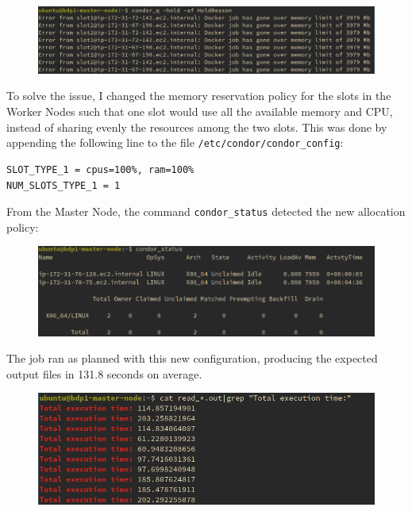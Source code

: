 \documentclass{article}
\begin{document}
\begin{figure}[!h]
    \center%
    \includegraphics[width=\textwidth]{./images/docker_hold.png}
\end{figure}
\FloatBarrier%

To solve the issue, I changed the memory reservation policy for the slots in the Worker Nodes such that one slot would use all the available memory and CPU, instead of sharing evenly the resources among the two slots.
This was done by appending the following line to the file \texttt{/etc/condor/condor\_config}:
\begin{lstlisting}
SLOT_TYPE_1 = cpus=100%, ram=100%
NUM_SLOTS_TYPE_1 = 1
\end{lstlisting}
From the Master Node, the command \texttt{condor\_status} detected the new allocation policy:
\begin{figure}[!h]
    \center%
    \includegraphics[width=\textwidth]{./images/condor_slot_single.png}
\end{figure}
\FloatBarrier%

The job ran as planned with this new configuration, producing the expected output files in 131.8 seconds on average.
\begin{figure}[!h]
    \center%
    \includegraphics[width=\textwidth]{./images/docker_time.png}
\end{figure}
\FloatBarrier%
\end{document}
